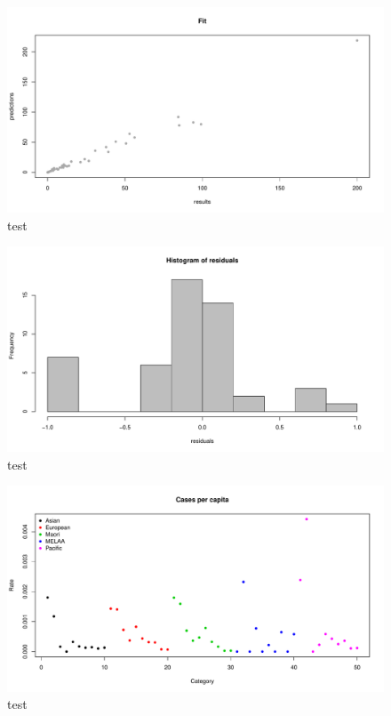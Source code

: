 \documentclass{article}
\begin{document}
\begin{figure}[h!]
\begin{center}
\includegraphics{interimreport2-017}
\end{center}
\caption{test}
\label{fig:test}
\end{figure}


\begin{figure}[h!]
\begin{center}
\includegraphics{interimreport2-019}
\end{center}
\caption{test}
\label{fig:test}
\end{figure}

\begin{figure}[h!]
\begin{center}
\includegraphics{interimreport2-020}
\end{center}
\caption{test}
\label{fig:test}
\end{figure}
\end{document}
